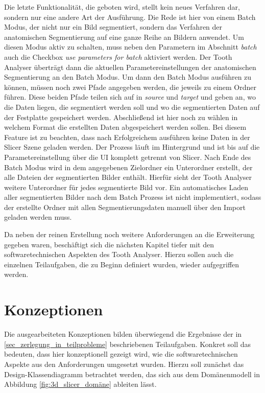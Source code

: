 Die letzte Funktionalität, die geboten wird, stellt kein neues Verfahren dar, sondern
nur eine andere Art der Ausführung. Die Rede ist hier von einem Batch Modus, der
nicht nur ein Bild segmentiert, sondern das Verfahren der anatomischen
Segmentierung auf eine ganze Reihe an Bildern anwendet. Um diesen Modus aktiv zu
schalten, muss neben den Parametern im Abschnitt \textit{batch} auch die Checkbox
\textit{use parameters for batch} aktiviert werden. Der Tooth Analyser überträgt
dann die aktuellen Parametereinstellungen der anatomischen Segmentierung an den Batch
Modus. Um dann den Batch Modus ausführen zu können, müssen noch zwei Pfade angegeben
werden, die jeweils zu einem Ordner führen. Diese beiden Pfade teilen sich auf in
\textit{source} und \textit{target} und geben an, wo die Daten liegen, die segmentiert
werden soll und wo die segmentierten Daten auf der Festplatte gespeichert werden.
Abschließend ist hier noch zu wählen in welchem Format die erstellten Daten
abgespeichert werden sollen. Bei diesem Feature ist zu beachten, dass nach
Erfolgreichem ausführen keine Daten in der Slicer Szene geladen werden. Der Prozess
läuft im Hintergrund und ist bis auf die Parametereinstellung über die UI komplett
getrennt von Slicer. Nach Ende des Batch Modus wird in dem angegebenen
Zielordner ein Unterordner erstellt, der alle Dateien der segmentierten Bilder enthält.
Hierfür sieht der Tooth Analyser weitere Unterordner für jedes segmentierte Bild
vor. Ein automatisches Laden aller segmentierten Bilder nach dem Batch Prozess ist
nicht implementiert, sodass der erstellte Ordner mit allen Segmentierungsdaten
manuell über den Import geladen werden muss.

Da neben der reinen Erstellung noch weitere Anforderungen an die Erweiterung
gegeben waren, beschäftigt sich die nächsten Kapitel tiefer mit den softwaretechnischen
Aspekten des Tooth Analyser. Hierzu sollen auch die einzelnen Teilaufgaben, die zu
Beginn definiert wurden, wieder aufgegriffen werden.

\section{Konzeptionen}
\label{sec:konzeptionen} Die ausgearbeiteten Konzeptionen bilden überwiegend die
Ergebnisse der in \ref{sec_zerlegung_in_teilprobleme} beschriebenen Teilaufgaben.
Konkret soll das bedeuten, dass hier konzeptionell gezeigt wird, wie die softwaretechnischen
Aspekte aus den Anforderungen umgesetzt wurden. Hierzu soll zunächst das Design-Klassendiagramm
betrachtet werden, das sich aus dem Domänenmodell in Abbildung \ref{fig:3d_slicer_domäne}
ableiten lässt.

